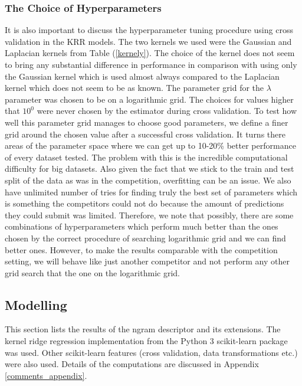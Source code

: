 \documentclass[11pt,oneside,czech,american]{book} %
\theoremstyle{definition} %
\theoremstyle{definition}
\begin{document}
\subsubsection{The Choice of Hyperparameters}
It is also important to discuss the hyperparameter tuning procedure using cross validation in the KRR models. The two kernels we used were the Gaussian and Laplacian kernels from Table (\ref{kernely}). The choice of the kernel does not seem to bring any substantial difference in performance in comparison with using only the Gaussian kernel which is used almost always compared to the Laplacian kernel which does not seem to be as known. The parameter grid for the $\lambda$ parameter was chosen to be on a logarithmic grid. The choices for values higher that $10^0$ were never chosen by the estimator during cross validation. To test how well this parameter grid manages to choose good parameters, we define a finer grid around the chosen value after a successful cross validation. It turns there areas of the parameter space where we can get up to 10-20\% better performance of every dataset tested. The problem with this is the incredible computational difficulty for big datasets. Also given the fact that we stick to the train and test split of the data as was in the competition, overfitting can be an issue. We also have unlimited number of tries for finding truly the best set of parameters which is something the competitors could not do because the amount of predictions they could submit was limited. Therefore, we note that possibly, there are some combinations of hyperparameters which perform much better than the ones chosen by the correct procedure of searching logarithmic grid and we can find better ones. However, to make the results comparable with the competition setting, we will behave like just another competitor and not perform any other grid search that the one on the logarithmic grid.


\subsection{Modelling}
This section lists the results of the ngram descriptor and its extensions. The kernel ridge regression implementation from the Python 3 scikit-learn \parencite{sklearn_api} package was used. Other scikit-learn features (cross validation, data transformations etc.) were also used. Details of the computations are discussed in Appendix \ref{comments_appendix}.
\end{document}
